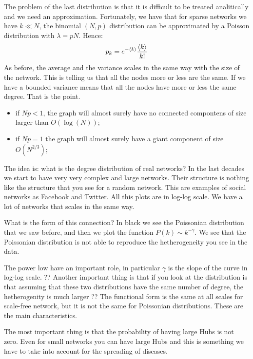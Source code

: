 \documentclass[../main/main.tex]{subfiles}
\begin{document}
The problem of the last distribution is that it is difficult to be treated analitically and we need an approximation. Fortunately, we have that for sparse networks we have \( k \ll N \), the binomial \( (N,p) \) distribution can be approximated by a Poisson distribution with \( \lambda = p N \). Hence:
\begin{equation*}
  p_k = e^{- \expval{k} } \frac{\expval{k} }{k!}
\end{equation*}
As before, the average and the variance scales in the same way with the size of the network. This is telling us that all the nodes more or less are the same. If we have a bounded variance means that all the nodes have more or less the same degree. That is the point.

\begin{itemize}
\item if \( N p < 1 \), the graph will almost surely have no connected compontens of size larger than \( O(\log(N)) \);
\item if \( N p = 1 \) the graph will almost surely have a giant component of size \( O(N^{2/3}) \);
\end{itemize}

The idea is: what is the degree distribution of real networks? In the last decades we start to have very very complex and large networks. Their structure is nothing like the structure that you see for a random network. This are examples of social networks as Facebook and Twitter. All this plots are in log-log scale. We have a lot of networks that scales in the same way.

What is the form of this connection? In black we see the Poissonian distribution that we saw before, and then we plot the function \( P(k) \sim k^{- \gamma  } \). We see that the Poissonian distribution is not able to reproduce the hetherogeneity you see in the data.

The power low have an important role, in particular \( \gamma   \) is the slope of the curve in log-log scale.
?? Another important thing is that if you look at the distribution  is that assuming that these two distributions have the same number of degree, the hetherogenity is much larger ??
The functional form is the same at all scales for scale-free network, but it is not the same for Poissonian distributions. These are the main characteristics.

The most important thing is that the probability of having large Hubs is not zero. Even for small networks you can have large Hubs and this is something we have to take into account for the spreading of diseases.
\end{document}
